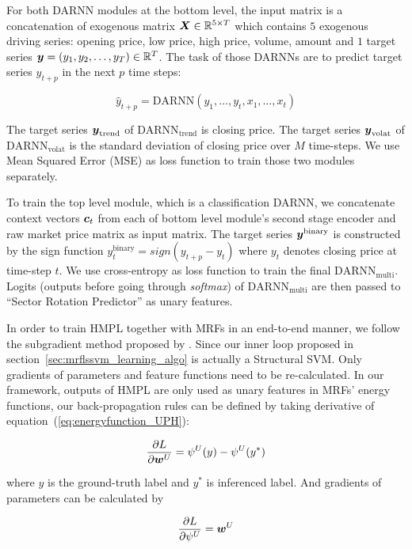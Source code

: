 \documentclass[sigconf,anonymous,review]{acmart}
\renewcommand{\citename}{\citet}
\begin{document}
For both DARNN modules at the bottom level, the input matrix is a
concatenation of exogenous matrix ${\boldsymbol{X}} \in \mathbb{R}^{5\times T}$
which contains $5$ exogenous driving series: opening price, low
price, high price, volume, amount and $1$ target series ${\boldsymbol{y}} =
(y_1,y_2,\dots,y_T) \in \mathbb{R}^T$. The task of those DARNNs are
to predict target series $y_{t+p}$ in the next $p$ time steps:

$$\hat{y}_{t+p} = \text{DARNN}(y_1,\dots,y_{t},x_1,\dots,x_t)$$

The target series ${\boldsymbol{y}}_{\text{trend}}$ of
$\text{DARNN}_{\text{trend}}$ is closing price. The target series
${\boldsymbol{y}}_{\text{volat}}$ of $\text{DARNN}_{\text{volat}}$ is the
standard deviation of closing price over $M$ time-steps. We use
Mean Squared Error (MSE) as loss function to train those two
modules separately.

To train the top level module, which is a classification DARNN,
we concatenate context vectors $\boldsymbol{c}_t$ from each of bottom level
module's second stage encoder and raw market price matrix as
input matrix. The target series ${\boldsymbol{y}}^{\text{binary}}$ is
constructed by the sign function $y_t^{\text{binary}} =
sign(y_{t+p}-y_t)$ where $y_t$ denotes closing price at time-step
$t$. We use cross-entropy as loss function to train the final
$\text{DARNN}_{\text{multi}}$. Logits (outputs before going through
\emph{softmax}) of $\text{DARNN}_{\text{multi}}$ are then passed to 
``Sector Rotation Predictor'' as unary features.

In order to train HMPL together with MRFs in an end-to-end manner,
we follow the subgradient method proposed by \citename{witoonchart2017application}.
Since our inner loop proposed in section~\ref{sec:mrflssvm_learning_algo}
is actually a Structural SVM. Only gradients of parameters and feature
functions need to be re-calculated. 
In our framework, outputs of HMPL are only used as unary features in MRFs'
energy functions, our back-propagation rules can be defined by
taking derivative of equation~(\ref{eq:energyfunction_UPH}):

\begin{align}
  \label{eq:der_w}
  \frac{\partial L}{\partial {\boldsymbol{w}}^U} = \psi^U(y)-\psi^U(y^*)
\end{align}

\noindent where $y$ is the ground-truth label and $y^*$ is
inferenced label. And gradients of parameters can be calculated by

\begin{align}
  \label{eq:der_phi}
  \frac{\partial L}{\partial \psi^U} = {\boldsymbol{w}}^U
\end{align}
\end{document}
